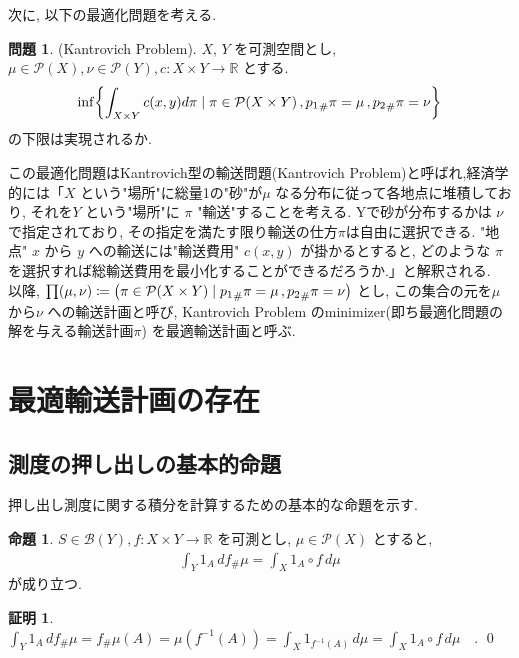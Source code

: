 \documentclass[10pt, fleqn, label-section=none, titlepage]{bxjsarticle}
\theoremstyle{definition}
\newtheorem{prop}[dfn]{命題}
\newtheorem*{pf*}{証明}
\newtheorem*{problem*}{問題}
\newcommand{\paren}[1]{\mleft( #1\mright )}
\newcommand{\cbra}[1]{\mleft\{#1\mright\}}
\newcommand{\proj}[1]{p_{#1}}
\renewcommand{\;}{\, ; \,}
\renewcommand{\d}{\, {d}}
\begin{document}
次に, 以下の最適化問題を考える.

\begin{problem*}
\label{KP}
(Kantrovich Problem). $X$, $Y$ を可測空間とし, $\mu \in \mathcal{P}(X), \nu \in \mathcal{P}(Y), c:X\times Y \rightarrow \mathbb{R}$ とする.
\begin{align*}
\inf \cbra{ \int_{X \times Y} c(x, y) d\pi \mid \pi \in \mathcal{P}(X \times Y)\mathop{, } {\proj{1}}_{\#}\pi = \mu \mathop{, } {\proj{2}}_{\#}\pi = \nu }
\end{align*}
の下限は実現されるか.
\end{problem*}

この最適化問題はKantrovich型の輸送問題(Kantrovich Problem)と呼ばれ,経済学的には「$X$ という"場所"に総量1の"砂"が$\mu$ なる分布に従って各地点に堆積しており, それを$Y$ という"場所"に $\pi$ "輸送"することを考える. Yで砂が分布するかは $\nu$ で指定されており, その指定を満たす限り輸送の仕方$\pi$は自由に選択できる. "地点" $x$ から $y$ への輸送には"輸送費用" $c(x, y)$ が掛かるとすると, どのような $\pi$ を選択すれば総輸送費用を最小化することができるだろうか.」と解釈される.\\

以降, $\prod (\mu, \nu) \coloneqq \paren{ \pi \in \mathcal{P}(X \times Y) \mid {\proj{1}}_{\#}\pi = \mu \mathop{, } {\proj{2}}_{\#}\pi = \nu }$ とし, この集合の元を$\mu$ から$\nu$ への輸送計画と呼び, Kantrovich Problem のminimizer(即ち最適化問題の解を与える輸送計画$\pi$) を最適輸送計画と呼ぶ.

\newpage

\section{最適輸送計画の存在}

\subsection{測度の押し出しの基本的命題}

押し出し測度に関する積分を計算するための基本的な命題を示す.
 
\begin{prop}
\label{1438}
$S \in \mathcal{B}(Y) \mathop{, }f:X \times Y \rightarrow \mathbb{R}$ を可測とし, $\mu \in \mathcal{P}(X)$ とすると, 
\begin{align*}
\int_{Y} 1_{A} \d f_{\#}\mu = \int_{X} 1_{A} \circ f \d\mu 
\end{align*}
が成り立つ.
\end{prop}
\begin{pf*}
$
\int_{Y} 1_{A} \d f_{\#}\mu
= f_{\#}{\mu} (A) 
= \mu \left( f^{-1}(A) \right) 
= \int_{X} 1_{f^{-1}(A)} \d\mu 
= \int_{X} 1_{A} \circ f \d\mu \quad. 
$
\qed
\end{pf*}
\end{document}
